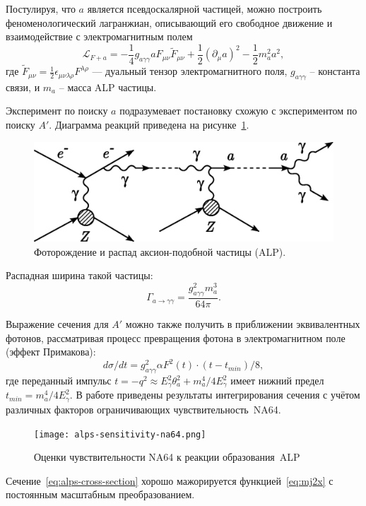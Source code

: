 Постулируя, что $a$ является псевдоскалярной частицей, можно построить 
феноменологический лагранжиан, описывающий его свободное движение и взаимодействие 
с электромагнитным полем 
\begin{equation}
    \mathcal{L}_{F+a} = - \frac{1}{4} g_{a \gamma \gamma} a F_{\mu \nu} \tilde F_{\mu \nu}
        + \frac{1}{2} (\partial_{\mu} a)^2 - \frac{1}{2} m^2_a a^2,
\end{equation}
где $\tilde{F}_{\mu \nu} = \frac{1}{2} \epsilon_{\mu \nu \lambda \rho} F^{\lambda \rho}$ --- дуальный тензор электромагнитного поля,
$g_{a \gamma \gamma}$ -- константа связи, и $m_a$ -- масса ALP частицы.

Эксперимент по поиску $a$ подразумевает постановку схожую с экспериментом
по поиску $A'$. Диаграмма реакций приведена на рисунке~\ref{fig:axion-photo}.
\begin{figure}[ht]
    \centering
    \includegraphics[width=0.6\linewidth]{images/illustrative/ALPs-photoprod-ours.eps}
    \caption{Фоторождение и распад аксион-подобной частицы (ALP).}
    \label{fig:axion-photo}
\end{figure}

Распадная ширина такой частицы:
\begin{equation}
    \Gamma_{a\rightarrow \gamma \gamma} = \frac{g^2_{a\gamma\gamma} m_a^3}{64 \pi}.
\end{equation}

Выражение сечения для $A'$ можно также получить в приближении
эквивалентных фотонов, рассматривая процесс превращения фотона в
электромагнитном поле (эффект Примакова):
\begin{equation}
    d \sigma / d t = g^2_{a\gamma\gamma} \alpha F^2(t) \cdot (t - t_{min}) / 8,
    \label{eq:alps-cross-section}
\end{equation}
где переданный импульс $t = -q^2 \approx E_\gamma^2 \theta^2_a + m^4_a / 4 E_\gamma^2$ имеет нижний предел $t_{min} = m^4_a / 4 E_\gamma^2$.
В работе \cite{alps-PRD} приведены результаты
интегрирования сечения с учётом различных факторов ограничивающих
чувствительность~NA64.

\begin{figure}
    \centering
    \texttt{[image: alps-sensitivity-na64.png]}
    \caption{Оценки чувствительности NA64 к реакции
    образования~ALP~\cite{alps-PRD}}
    \label{fig:alps-sensitivity}
\end{figure}

Сечение~\eqref{eq:alps-cross-section}
хорошо мажорируется функцией~\eqref{eq:mj2x} с постоянным масштабным
преобразованием.
